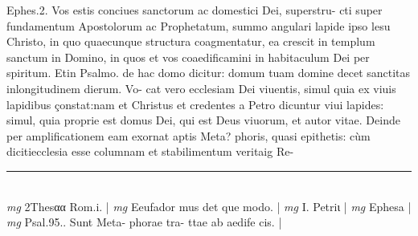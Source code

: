 \documentclass{article}
\begin{document}
\begin{pages}
Ephes.2. Vos estis conciues sanctorum ac domestici Dei, superstru- cti super fundamentum Apostolorum ac Prophetatum, summo angulari lapide ipso lesu Christo, in quo quaecunque structura coagmentatur, ea crescit in templum sanctum in Domino, in quos et vos coaedificamini in habitaculum Dei per spiritum. Etin Psalmo. de hac domo dicitur: domum tuam domine decet sanctitas inlongitudinem dierum. Vo- cat vero ecclesiam Dei viuentis, simul quia ex viuis lapidibus çonstat:nam et Christus et credentes a Petro dicuntur viui lapides: simul, quia proprie est domus Dei, qui est Deus viuorum, et autor vitae. Deinde per amplificationem eam exornat aptis Meta? phoris, quasi epithetis: cùm dicitiecclesia esse columnam et stabilimentum veritaig Re-  \pend
\vspace{0.5cm}\noindent
\vspace{0.2cm}\rule{1cm}{0.2pt}\\ 
\hspace{0.2cm}\textit{mg}
\footnotesize 2Thesαα Rom.i. 
\normalsize| 
\hspace{0.2cm}\textit{mg}
\footnotesize Eeufador mus det que modo. 
\normalsize| 
\hspace{0.2cm}\textit{mg}
\footnotesize I. Petriι 
\normalsize| 
\hspace{0.2cm}\textit{mg}
\footnotesize Ephesa 
\normalsize| 
\hspace{0.2cm}\textit{mg}
\footnotesize Psal.95.. Sunt Meta- phorae tra- ttae ab aedife cis. 
\normalsize| 

\end{pages}
\end{document}
